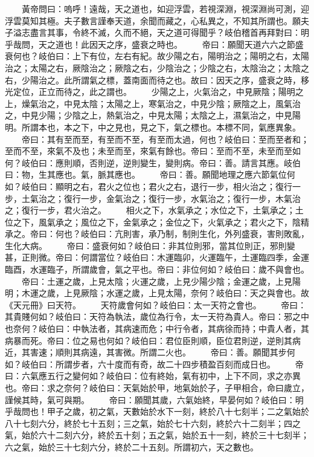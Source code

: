 　　黃帝問曰：嗚呼！遠哉，天之道也，如迎浮雲，若視深淵，視深淵尚可測，迎浮雲莫知其極。夫子數言謹奉天道，余聞而藏之，心私異之，不知其所謂也。願夫子溢志盡言其事，令終不滅，久而不絕，天之道可得聞乎？岐伯稽首再拜對曰：明乎哉問，天之道也！此因天之序，盛衰之時也。
　　帝曰：願聞天道六六之節盛衰何也？岐伯曰：上下有位，左右有紀。故少陽之右，陽明治之；陽明之右，太陽治之；太陽之右，厥陰治之；厥陰之右，少陰治之；少陰之右，太陰治之；太陰之右，少陽治之。此所謂氣之標，蓋南面而待之也。故曰：因天之序，盛衰之時，移光定位，正立而待之，此之謂也。
　　少陽之上，火氣治之，中見厥陰；陽明之上，燥氣治之，中見太陰；太陽之上，寒氣治之，中見少陰；厥陰之上，風氣治之，中見少陽；少陰之上，熱氣治之，中見太陽；太陰之上，濕氣治之，中見陽明。所謂本也，本之下，中之見也，見之下，氣之標也。本標不同，氣應異象。
　　帝曰：其有至而至，有至而不至，有至而太過，何也？岐伯曰：至而至者和；至而不至，來氣不及也；未至而至，來氣有餘也。帝曰：至而不至，未至而至如何？岐伯曰：應則順，否則逆，逆則變生，變則病。帝曰：善。請言其應。岐伯曰：物，生其應也。氣，脈其應也。
　　帝曰：善。願聞地理之應六節氣位何如？岐伯曰：顯明之右，君火之位也；君火之右，退行一步，相火治之；復行一步，土氣治之；復行一步，金氣治之；復行一步，水氣治之；復行一步，木氣治之；復行一步，君火治之。
　　相火之下，水氣承之；水位之下，土氣承之；土位之下，風氣承之；風位之下，金氣承之；金位之下，火氣承之；君火之下，陰精承之。帝曰：何也？岐伯曰：亢則害，承乃制，制則生化，外列盛衰，害則敗亂，生化大病。
　　帝曰：盛衰何如？岐伯曰：非其位則邪，當其位則正，邪則變甚，正則微。帝曰：何謂當位？岐伯曰：木運臨卯，火運臨午，土運臨四季，金運臨酉，水運臨子，所謂歲會，氣之平也。帝曰：非位何如？岐伯曰：歲不與會也。
　　帝曰：土運之歲，上見太陰；火運之歲，上見少陽少陰；金運之歲，上見陽明；木運之歲，上見厥陰；水運之歲，上見太陽，奈何？岐伯曰：天之與會也。故《天元冊》曰天符。
　　天符歲會何如？岐伯曰：太一天符之會也。
　　帝曰：其貴賤何如？岐伯曰：天符為執法，歲位為行令，太一天符為貴人。帝曰：邪之中也奈何？岐伯曰：中執法者，其病速而危；中行令者，其病徐而持；中貴人者，其病暴而死。帝曰：位之易也何如？岐伯曰：君位臣則順，臣位君則逆，逆則其病近，其害速；順則其病遠，其害微。所謂二火也。
　　帝曰：善。願聞其步何如？岐伯曰：所謂步者，六十度而有奇，故二十四步積盈百刻而成日也。
　　帝曰：六氣應五行之變何如？岐伯曰：位有終始，氣有初中，上下不同，求之亦異也。帝曰：求之奈何？岐伯曰：天氣始於甲，地氣始於子，子甲相合，命曰歲立，謹候其時，氣可與期。
　　帝曰：願聞其歲，六氣始終，早晏何如？岐伯曰：明乎哉問也！甲子之歲，初之氣，天數始於水下一刻，終於八十七刻半；二之氣始於八十七刻六分，終於七十五刻；三之氣，始於七十六刻，終於六十二刻半；四之氣，始於六十二刻六分，終於五十刻；五之氣，始於五十一刻，終於三十七刻半；六之氣，始於三十七刻六分，終於二十五刻。所謂初六，天之數也。
